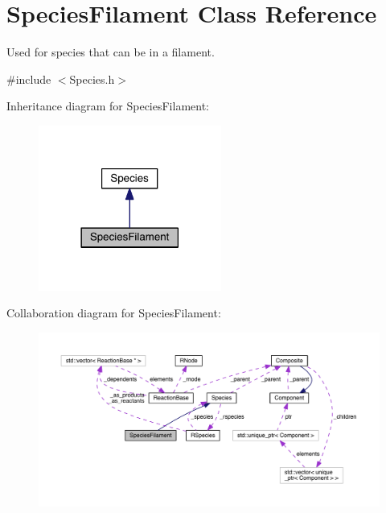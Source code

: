 \hypertarget{classSpeciesFilament}{\section{Species\+Filament Class Reference}
\label{classSpeciesFilament}
}


Used for species that can be in a filament.  




{\ttfamily \#include $<$Species.\+h$>$}



Inheritance diagram for Species\+Filament\+:\nopagebreak
\begin{figure}[H]
\begin{center}
\leavevmode
\includegraphics[width=170pt]{classSpeciesFilament__inherit__graph}
\end{center}
\end{figure}


Collaboration diagram for Species\+Filament\+:\nopagebreak
\begin{figure}[H]
\begin{center}
\leavevmode
\includegraphics[width=350pt]{classSpeciesFilament__coll__graph}
\end{center}
\end{figure}

